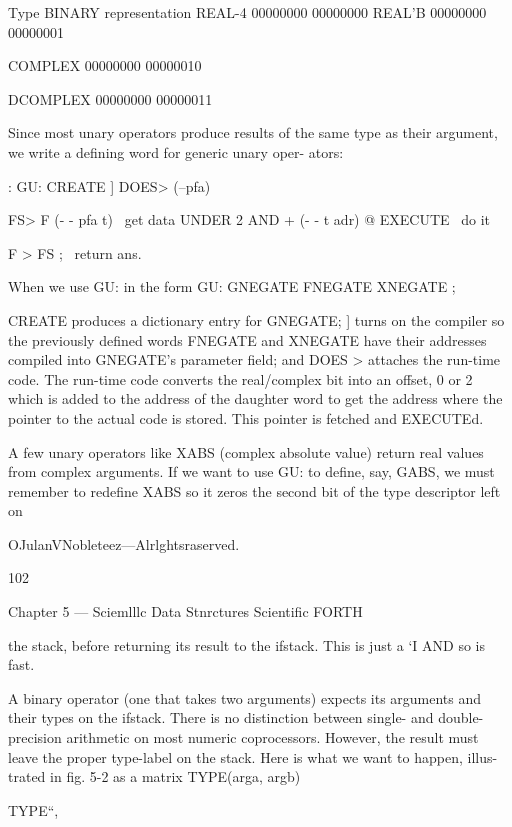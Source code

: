  

Type BINARY representation
REAL-4 00000000 00000000
REAL'B 00000000 00000001

COMPLEX 00000000 00000010

DCOMPLEX 00000000 00000011

 

 

 

Since most unary operators produce results of the same type as
their argument, we write a defining word for generic unary oper-
ators:

: GU: CREATE ] DOES> (--pfa)

FS> F (- - pfa t) \ get data
UNDER 2 AND + (- - t adr)
@ EXECUTE \ do it

F > FS ; \ return ans.

When we use GU: in the form
GU: GNEGATE FNEGATE XNEGATE ;

CREATE produces a dictionary entry for GNEGATE; ] turns on
the compiler so the previously defined words FNEGATE and
XNEGATE have their addresses compiled into GNEGATE’s
parameter field; and DOES > attaches the run-time code. The
run-time code converts the real/complex bit into an offset, 0 or 2
which is added to the address of the daughter word to get the
address where the pointer to the actual code is stored. This
pointer is fetched and EXECUTEd.

A few unary operators like XABS (complex absolute value)
return real values from complex arguments. If we want to use
GU: to define, say, GABS, we must remember to redefine
XABS so it zeros the second bit of the type descriptor left on

OJulanVNobleteez—Alrlghtsraserved.

102

Chapter 5 — Sciemlllc Data Stnrctures Scientific FORTH

the stack, before returning its result to the ifstack. This is just a ‘I
AND so is fast.

A binary operator (one that takes two arguments) expects its
arguments and their types on the ifstack. There is no distinction
between single- and double-precision arithmetic on most
numeric coprocessors. However, the result must leave the proper
type-label on the stack. Here is what we want to happen, illus-
trated in fig. 5-2 as a matrix TYPE(arga, argb)

 

 

TYPE“,

 

